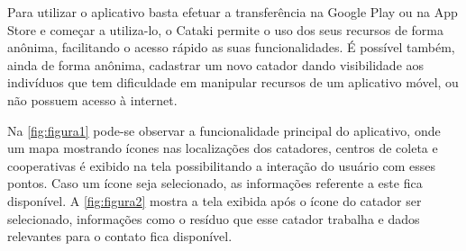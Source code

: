 \documentclass[
	12pt,				%
	openright,			%
	twoside,			%
	a4paper,			%
	english,			%
	french,				%
	spanish,			%
	brazil				%
	]{abntex2}
\begin{document}
Para utilizar o aplicativo basta efetuar a transferência na Google Play\cite{googleplay} ou na App Store\cite{appstore} e começar a utiliza-lo, o Cataki permite o uso dos seus recursos de forma anônima, facilitando o acesso rápido as suas funcionalidades. É possível também, ainda de forma anônima, cadastrar um novo catador dando visibilidade aos indivíduos que tem dificuldade em manipular recursos de um aplicativo móvel, ou não possuem acesso à internet.

Na \autoref{fig:figura1} pode-se observar a funcionalidade principal do aplicativo, onde um mapa mostrando ícones nas localizações dos catadores, centros de coleta e cooperativas é exibido na tela possibilitando a interação do usuário com esses pontos. Caso um ícone seja selecionado, as informações referente a este fica disponível. A \autoref{fig:figura2} mostra a tela exibida após o ícone do catador ser selecionado, informações como o resíduo que esse catador trabalha e dados relevantes para o contato fica disponível. 
    
\end{document}
